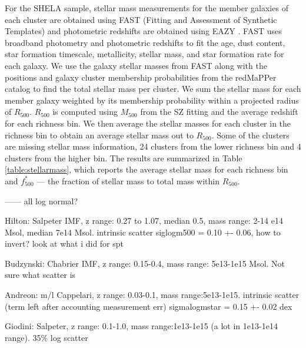 \documentclass[a4paper,fleqn,usenatbib]{mnras}
\begin{document}
For the SHELA sample, stellar mass measurements for the member galaxies of each cluster are obtained using FAST (Fitting and Assessment of Synthetic Templates) \citep{2009ApJ...700..221K} and photometric redshifts are obtained using EAZY \citep{2008ApJ...686.1503B}. FAST uses broadband photometry and photometric redshifts to fit the age, dust content, star formation timescale, metallicity, stellar mass, and star formation rate for each galaxy. We use the galaxy stellar masses from FAST along with the positions and galaxy cluster membership probabilities from the redMaPPer catalog to find the total stellar mass per cluster. We sum the stellar mass for each member galaxy weighted by its membership probability within a projected radius of $R_{500}$. $R_{500}$ is computed using $M_{500}$ from the SZ fitting and the average redshift for each richness bin. We then average the stellar masses for each cluster in the richness bin to obtain an average stellar mass out to $R_{500}$. Some of the clusters are missing stellar mass information, 24 clusters from the lower richness bin and 4 clusters from the higher bin. The results are summarized in Table \ref{table:stellarmass}, which reports the average stellar mass for each richness bin and $f^*_{500}$ --- the fraction of stellar mass to total mass within $R_{500}$. %

------
all log normal?

Hilton: Salpeter IMF, z range: 0.27 to 1.07, median 0.5, mass range: 2-14 e14 Msol, median 7e14 Msol. intrinsic scatter siglogm500 = 0.10 +- 0.06, how to invert? look at what i did for spt

Budzynski: Chabrier IMF, z range: 0.15-0.4, mass range:  5e13-1e15 Msol. Not sure what scatter is

Andreon: m/l Cappelari, z range: 0.03-0.1, mass range:5e13-1e15. intrinsic scatter (term left after accounting measurement err) sigmalogmstar = 0.15 +- 0.02 dex

Giodini: Salpeter, z range: 0.1-1.0, mass range:1e13-1e15 (a lot in 1e13-1e14 range). 35\% log scatter
\end{document}
